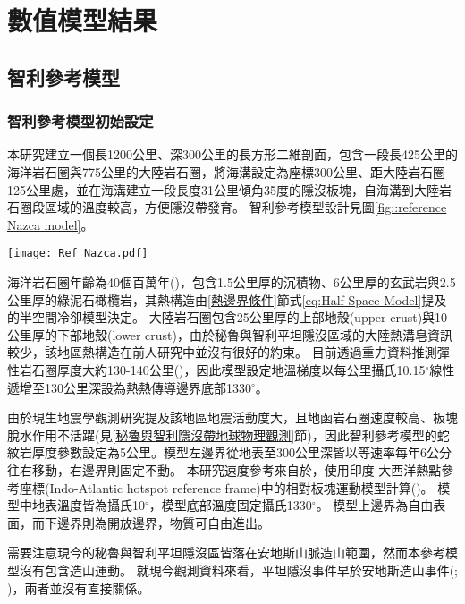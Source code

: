 
\chapter{數值模型結果}

\section{智利參考模型}
\subsection{智利參考模型初始設定}\label{智利參考模型初始模型設定}
本研究建立一個長1200公里、深300公里的長方形二維剖面，包含一段長425公里的海洋岩石圈與775公里的大陸岩石圈，將海溝設定為座標300公里、距大陸岩石圈125公里處，並在海溝建立一段長度31公里傾角35度的隱沒板塊，自海溝到大陸岩石圈段區域的溫度較高，方便隱沒帶發育。
智利參考模型設計見圖\ref{fig::reference Nazca model}。

\begin{figure*}[hb]
    \centering
    \texttt{[image: Ref\_Nazca.pdf]}
    \caption[智利參考模型設計與邊界條件示意圖]{智利參考模型設計與邊界條件示意圖}
    \label{fig::reference Nazca model}
\end{figure*}

海洋岩石圈年齡為40個百萬年(\citealp{muller2019})，包含1.5公里厚的沉積物、6公里厚的玄武岩與2.5公里厚的綠泥石橄欖岩，其熱構造由\ref{熱邊界條件}節式\ref{eq:Half Space Model}提及的半空間冷卻模型決定。
大陸岩石圈包含25公里厚的上部地殼(upper crust)與10公里厚的下部地殼(lower crust)，由於秘魯與智利平坦隱沒區域的大陸熱溝皂資訊較少，該地區熱構造在前人研究中並沒有很好的約束。
目前透過重力資料推測彈性岩石圈厚度大約130-140公里(\citealp{perez2008})，因此模型設定地溫梯度以每公里攝氏10.15$^{\circ}$線性遞增至130公里深設為熱熱傳導邊界底部1330$^{\circ}$。

由於現生地震學觀測研究提及該地區地震活動度大，且地函岩石圈速度較高、板塊脫水作用不活躍(見\ref{秘魯與智利隱沒帶地球物理觀測}節)，因此智利參考模型的蛇紋岩厚度參數設定為5公里。模型左邊界從地表至300公里深皆以等速率每年6公分往右移動，右邊界則固定不動。
本研究速度參考來自於\citealp{o2005uncertainties}，使用印度-大西洋熱點參考座標(Indo-Atlantic hotspot reference frame)中的相對板塊運動模型計算(\citealp{schellart2008global})。
模型中地表溫度皆為攝氏10$^{\circ}$，模型底部溫度固定攝氏1330$^{\circ}$。
模型上邊界為自由表面，而下邊界則為開放邊界，物質可自由進出。

需要注意現今的秘魯與智利平坦隱沒區皆落在安地斯山脈造山範圍，然而本參考模型沒有包含造山運動。
就現今觀測資料來看，平坦隱沒事件早於安地斯造山事件(\citealp{chen2019southward}; \citealp{hu2021southward})，兩者並沒有直接關係。


